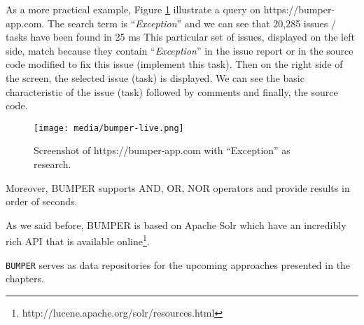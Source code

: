 As a more practical example, Figure \ref{fig:bumper-live} illustrate a query on https://bumper-app.com. The search term is  ``{\it Exception}'' and we can see that 20,285 issues / tasks have been found in 25 ms This particular set of issues, displayed on the left side, match because they contain ``{\it Exception}'' in the issue report or in the source code modified to fix this issue (implement this task). Then on the right side of the screen, the selected issue (task) is displayed. We can see the basic characteristic of the issue (task) followed by comments and finally, the source code.

\begin{figure}[h!]
  \centering
    \texttt{[image: media/bumper-live.png]}
    \caption{Screenshot of https://bumper-app.com with ``Exception'' as research.
    \label{fig:bumper-live}}
\end{figure}


Moreover, BUMPER supports AND, OR, NOR operators and provide results in order of seconds.

As we said before, BUMPER is based on Apache Solr which have an incredibly rich API that is available online\footnote{ http://lucene.apache.org/solr/resources.html}.

{\tt BUMPER} serves as data repositories for the upcoming approaches presented in the chapters.
